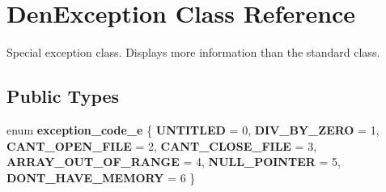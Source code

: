 \hypertarget{classDenException}{}\section{Den\+Exception Class Reference}
\label{classDenException}


Special exception class. Displays more information than the standard class.  


\subsection*{Public Types}
\begin{DoxyCompactItemize}
\item 
\mbox{\label{classDenException_a3d37ff4dd20ed1e4f83a4b15bea110a1}} 
enum {\bfseries exception\+\_\+code\+\_\+e} \{ \newline
{\bfseries U\+N\+T\+I\+T\+L\+ED} = 0, 
{\bfseries D\+I\+V\+\_\+\+B\+Y\+\_\+\+Z\+E\+RO} = 1, 
{\bfseries C\+A\+N\+T\+\_\+\+O\+P\+E\+N\+\_\+\+F\+I\+LE} = 2, 
{\bfseries C\+A\+N\+T\+\_\+\+C\+L\+O\+S\+E\+\_\+\+F\+I\+LE} = 3, 
\newline
{\bfseries A\+R\+R\+A\+Y\+\_\+\+O\+U\+T\+\_\+\+O\+F\+\_\+\+R\+A\+N\+GE} = 4, 
{\bfseries N\+U\+L\+L\+\_\+\+P\+O\+I\+N\+T\+ER} = 5, 
{\bfseries D\+O\+N\+T\+\_\+\+H\+A\+V\+E\+\_\+\+M\+E\+M\+O\+RY} = 6
 \}
\end{DoxyCompactItemize}
